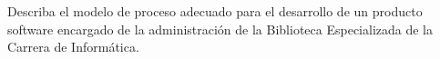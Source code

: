 Describa el modelo de proceso adecuado para el desarrollo de un producto software encargado de la administración de la Biblioteca Especializada de la Carrera de Informática.

